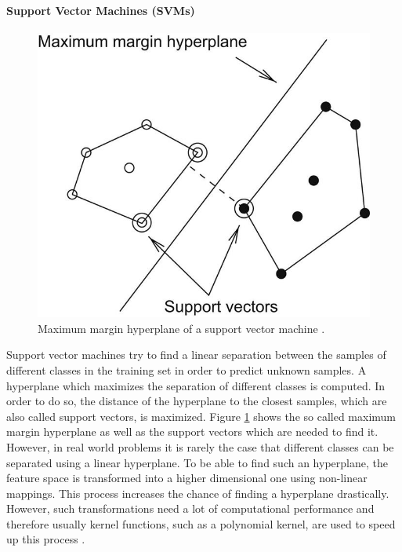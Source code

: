 \paragraph{Support Vector Machines (SVMs)}

\begin{figure}
	\centering
	\includegraphics{img/max_hyperplane_weka_book.jpg}

	\caption{Maximum margin hyperplane of a support vector machine \cite{Hall2016_DataMining_ML}. }
	\label{fig:max_hyperplane}
\end{figure}

Support vector machines try to find a linear separation between the samples of different classes in the training set in order to predict unknown samples. A hyperplane which maximizes the separation of different classes is computed. In order to do so, the distance of the hyperplane to the closest samples, which are also called support vectors, is maximized. Figure \ref{fig:max_hyperplane} shows the so called maximum margin hyperplane as well as the support vectors which are needed to find it. However, in real world problems it is rarely the case that different classes can be separated using a linear hyperplane. To be able to find such an hyperplane, the feature space is transformed into a higher dimensional one using non-linear mappings. This process increases the chance of finding a hyperplane drastically. However, such transformations need a lot of computational performance and therefore usually kernel functions, such as a polynomial kernel, are used to speed up this process \cite{Hall2016_DataMining_ML}. 





